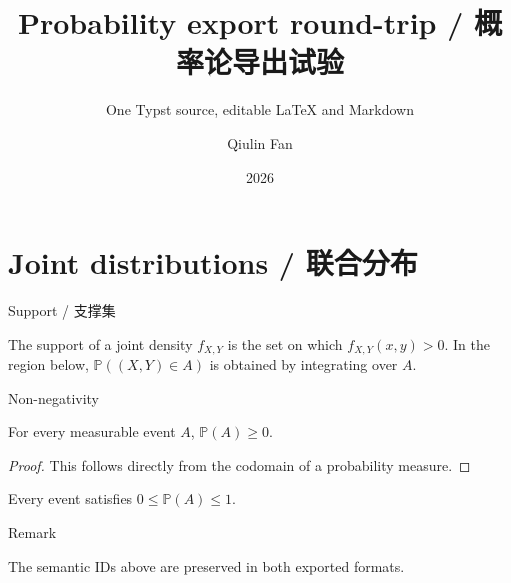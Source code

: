 \documentclass{qlnotes-export}
\title{Probability export round-trip / 概率论导出试验}
\subtitle{One Typst source, editable LaTeX and Markdown}
\author{Qiulin Fan}
\date{2026}
\begin{document}
\frontmatter
\maketitle
\tableofcontents

\mainmatter
\chapter{Joint distributions / 联合分布}

\begin{definition}{Support / 支撑集}\label{def-joint-support}

The support of a joint density \(f_{X,Y}\) is the set on which \(f_{X,Y}\left( {x,y} \right) > 0\). In the region below, \(\mathbb{P}\left( {\left( {X,Y} \right) \in A} \right)\) is obtained by integrating over \(A\).

\end{definition}

\begin{lemma}{Non-negativity}\label{lem-probability-nonnegative}

For every measurable event \(A\), \(\mathbb{P}(A) \geq 0\).

\end{lemma}

\begin{proof}

This follows directly from the codomain of a probability measure.

\end{proof}

\begin{corollary}\label{cor-probability-bound}

Every event satisfies \(0 \leq \mathbb{P}(A) \leq 1\).

\end{corollary}

\begin{qlremark}{Remark}

The semantic IDs above are preserved in both exported formats.

\end{qlremark}
\end{document}
